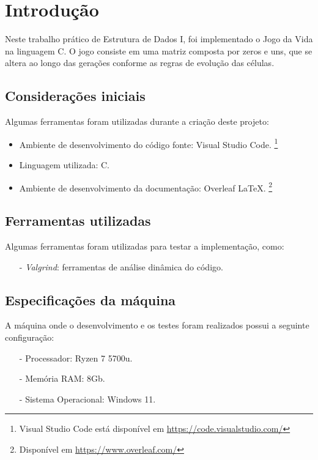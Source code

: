 \documentclass{article}
\begin{document}


\section{Introdução}

Neste trabalho prático de Estrutura de Dados I, foi implementado o Jogo da Vida na linguagem C. O jogo consiste em uma matriz composta por zeros e uns, que se altera ao longo das gerações conforme as regras de evolução das células.


\subsection{Considerações iniciais}

Algumas ferramentas foram utilizadas durante a criação deste projeto:

\begin{itemize}
  \item Ambiente de desenvolvimento do código fonte: Visual Studio Code. \footnote{Visual Studio Code está disponível em \url{https://code.visualstudio.com/}}
  \item Linguagem utilizada: C.
  \item Ambiente de desenvolvimento da documentação: Overleaf \LaTeX. \footnote{Disponível em \url{https://www.overleaf.com/}}
\end{itemize}

\subsection{Ferramentas utilizadas}
Algumas ferramentas foram utilizadas para testar a implementação, como:
\begin{itemize}
    \item[-] \textit{Valgrind}: ferramentas de análise dinâmica do código.
\end{itemize}

\subsection{Especificações da máquina}
A máquina onde o desenvolvimento e os testes foram realizados possui a seguinte configuração:
\begin{itemize}
    \item[-] Processador: Ryzen 7 5700u.
    \item[-] Memória RAM: 8Gb.
    \item[-] Sistema Operacional: Windows 11.
\end{itemize}
\end{document}
